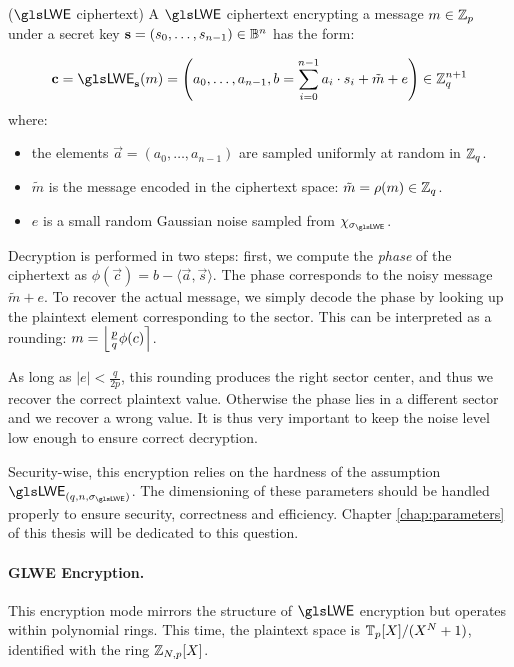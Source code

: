 \begin{definition}($\LWE$ ciphertext)
	A $\LWE$ ciphertext encrypting a message $m \in \mathbb{Z}_p$ under a secret key $\mathbf s=(s_0, \dots, s_{n-1}) \in \mathbb{B}^n$ has the form:
	
	\begin{equation}
		\vec c = \LWE_{\lweSecretKey}(m) = \left (a_0, \dots, a_{n-1}, b = \sum_{i=0}^{n-1} a_i \cdot s_i + \tilde m + e \right ) \in \lweRing^{n+1}
	\end{equation}
	where:
	\begin{itemize}
		\item the elements $\vec a = (a_0, \dots, a_{n-1})$ are sampled uniformly at random in $\mathbb{Z}_q$.

		\item $\tilde m$ is the message encoded in the ciphertext space: $\tilde m = \rho(m) \in \mathbb{Z}_q$.
		\item $e$ is a small random Gaussian noise sampled from $\chi_{\lweSigma}$.
	\end{itemize}
\end{definition}


Decryption is performed in two steps: first, we compute the \emph{phase} of the ciphertext as $\phi(\vec c) = b - \langle \vec a, \vec s\rangle$. The phase corresponds to the noisy message $\tilde{m} + e$. To recover the actual message, we simply decode the phase by looking up the plaintext element corresponding to the sector. This can be interpreted as a rounding: $m = \left \lfloor \frac p q \phi(c) \right \rceil$. 

As long as $|e| < \frac{q}{2p}$, this rounding produces the right sector center, and thus we recover the correct plaintext value. Otherwise the phase lies in a different sector and we recover a wrong value. It is thus very important to keep the noise level low enough to ensure correct decryption.


Security-wise, this encryption relies on the hardness of the assumption $\LWE_{(q, n, \lweSigma)}$. The dimensioning of these parameters should be handled properly to ensure security, correctness and efficiency. Chapter \ref{chap:parameters} of this thesis will be dedicated to this question.



\paragraph{GLWE Encryption.} This encryption mode mirrors the structure of $\LWE$ encryption but operates within polynomial rings.
This time, the plaintext space is $\mathbb{T}_p[X] / (X^N + 1)$, identified with the ring $\mathbb{Z}_{N,p}[X]$.

